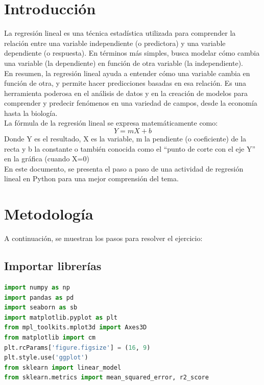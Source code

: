 \documentclass{article}
\begin{document}
\section{Introducción}
La regresión lineal es una técnica estadística utilizada para comprender la relación entre una variable independiente (o predictora) y una variable dependiente (o respuesta). En términos más simples, busca modelar cómo cambia una variable (la dependiente) en función de otra variable (la independiente).\\
En resumen, la regresión lineal ayuda a entender cómo una variable cambia en función de otra, y permite hacer predicciones basadas en esa relación. Es una herramienta poderosa en el análisis de datos y en la creación de modelos para comprender y predecir fenómenos en una variedad de campos, desde la economía hasta la biología.\\

La fórmula de la regresión lineal se expresa matemáticamente como:
\begin{equation}
Y = mX + b
\end{equation}
Donde Y es el resultado, X es la variable, m la pendiente (o coeficiente) de la recta y b la constante o también conocida como el “punto de corte con el eje Y” en la gráfica (cuando X=0)\\

En este documento, se presenta el paso a paso de una actividad de regresión lineal en Python para una mejor comprensión del tema.\\

\section{Metodología}
A continuación, se muestran los pasos para resolver el ejercicio:

\subsection{Importar librerías} 
\begin{lstlisting}[language=Python]
import numpy as np  
import pandas as pd  
import seaborn as sb 
import matplotlib.pyplot as plt 
from mpl_toolkits.mplot3d import Axes3D 
from matplotlib import cm 
plt.rcParams['figure.figsize'] = (16, 9)
plt.style.use('ggplot')
from sklearn import linear_model 
from sklearn.metrics import mean_squared_error, r2_score
\end{lstlisting}
\end{document}
